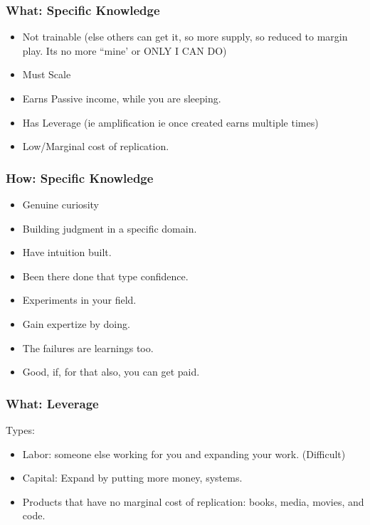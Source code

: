 \begin{frame}[fragile]
\frametitle{What: Specific Knowledge}
\begin{itemize}
\item Not trainable (else others can get it, so more supply, so reduced to margin play. Its no more ``mine' or ONLY I CAN DO)
\item Must Scale
\item Earns Passive income, while you are sleeping.
\item Has Leverage (ie amplification ie once created earns multiple times)
\item Low/Marginal cost of replication.
\end{itemize}
\end{frame}

\begin{frame}[fragile]
\frametitle{How: Specific Knowledge}
\begin{itemize}
\item Genuine curiosity
\item Building judgment in a specific domain. 
\item Have intuition built. 
\item Been there done that type confidence.
\item Experiments in your field. 
\item Gain expertize by doing. 
\item The failures are learnings too.
\item Good, if, for that also, you can get paid.
\end{itemize}
\end{frame}

\begin{frame}[fragile]
\frametitle{What: Leverage}
Types:
\begin{itemize}
\item Labor: someone else working for you and expanding your work. (Difficult)
\item Capital: Expand by putting more money, systems.
\item Products that have no marginal cost of replication: books, media, movies, and code.
\end{itemize}
\end{frame}


